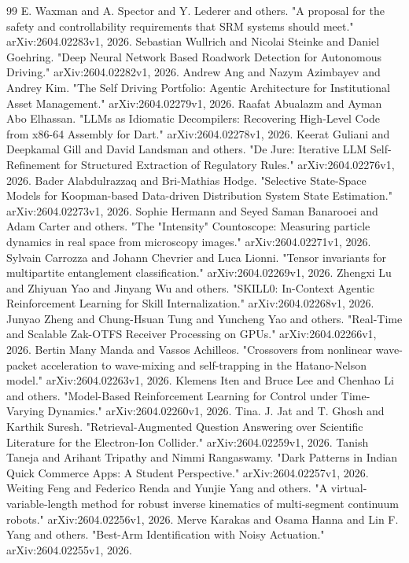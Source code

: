 \documentclass[11pt,a4paper]{article}
\begin{document}
\begin{thebibliography}{99}
 E. Waxman and A. Spector and Y. Lederer and others. "A proposal for the safety and controllability requirements that SRM systems should meet." arXiv:2604.02283v1, 2026.
 Sebastian Wullrich and Nicolai Steinke and Daniel Goehring. "Deep Neural Network Based Roadwork Detection for Autonomous Driving." arXiv:2604.02282v1, 2026.
 Andrew Ang and Nazym Azimbayev and Andrey Kim. "The Self Driving Portfolio: Agentic Architecture for Institutional Asset Management." arXiv:2604.02279v1, 2026.
 Raafat Abualazm and Ayman Abo Elhassan. "LLMs as Idiomatic Decompilers: Recovering High-Level Code from x86-64 Assembly for Dart." arXiv:2604.02278v1, 2026.
 Keerat Guliani and Deepkamal Gill and David Landsman and others. "De Jure: Iterative LLM Self-Refinement for Structured Extraction of Regulatory Rules." arXiv:2604.02276v1, 2026.
 Bader Alabdulrazzaq and Bri-Mathias Hodge. "Selective State-Space Models for Koopman-based Data-driven Distribution System State Estimation." arXiv:2604.02273v1, 2026.
 Sophie Hermann and Seyed Saman Banarooei and Adam Carter and others. "The "Intensity" Countoscope: Measuring particle dynamics in real space from microscopy images." arXiv:2604.02271v1, 2026.
 Sylvain Carrozza and Johann Chevrier and Luca Lionni. "Tensor invariants for multipartite entanglement classification." arXiv:2604.02269v1, 2026.
 Zhengxi Lu and Zhiyuan Yao and Jinyang Wu and others. "SKILL0: In-Context Agentic Reinforcement Learning for Skill Internalization." arXiv:2604.02268v1, 2026.
 Junyao Zheng and Chung-Hsuan Tung and Yuncheng Yao and others. "Real-Time and Scalable Zak-OTFS Receiver Processing on GPUs." arXiv:2604.02266v1, 2026.
 Bertin Many Manda and Vassos Achilleos. "Crossovers from nonlinear wave-packet acceleration to wave-mixing and self-trapping in the Hatano-Nelson model." arXiv:2604.02263v1, 2026.
 Klemens Iten and Bruce Lee and Chenhao Li and others. "Model-Based Reinforcement Learning for Control under Time-Varying Dynamics." arXiv:2604.02260v1, 2026.
 Tina. J. Jat and T. Ghosh and Karthik Suresh. "Retrieval-Augmented Question Answering over Scientific Literature for the Electron-Ion Collider." arXiv:2604.02259v1, 2026.
 Tanish Taneja and Arihant Tripathy and Nimmi Rangaswamy. "Dark Patterns in Indian Quick Commerce Apps: A Student Perspective." arXiv:2604.02257v1, 2026.
 Weiting Feng and Federico Renda and Yunjie Yang and others. "A virtual-variable-length method for robust inverse kinematics of multi-segment continuum robots." arXiv:2604.02256v1, 2026.
 Merve Karakas and Osama Hanna and Lin F. Yang and others. "Best-Arm Identification with Noisy Actuation." arXiv:2604.02255v1, 2026.

\end{thebibliography}
\end{document}
